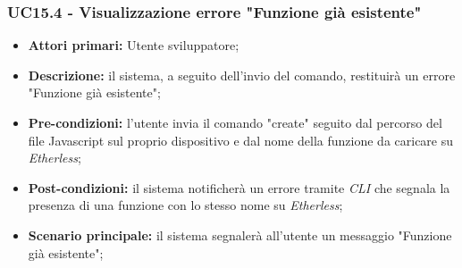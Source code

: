\subsubsection{UC15.4 - Visualizzazione errore "Funzione già esistente"}
\begin{itemize}
	\item \textbf{Attori primari:} Utente sviluppatore;
	\item \textbf{Descrizione:} il sistema, a seguito dell'invio del comando, restituirà un errore "Funzione già esistente";
	\item \textbf{Pre-condizioni:}  l'utente invia il comando "create" seguito dal percorso del file Javascript sul proprio dispositivo e dal nome della funzione da caricare su \textit{Etherless};
	\item \textbf{Post-condizioni:} il sistema notificherà un errore tramite \textit{CLI\glo} che segnala la presenza di una funzione con lo stesso nome su \textit{Etherless};
	\item \textbf{Scenario principale:} il sistema segnalerà all'utente un messaggio "Funzione già esistente";
\end{itemize}